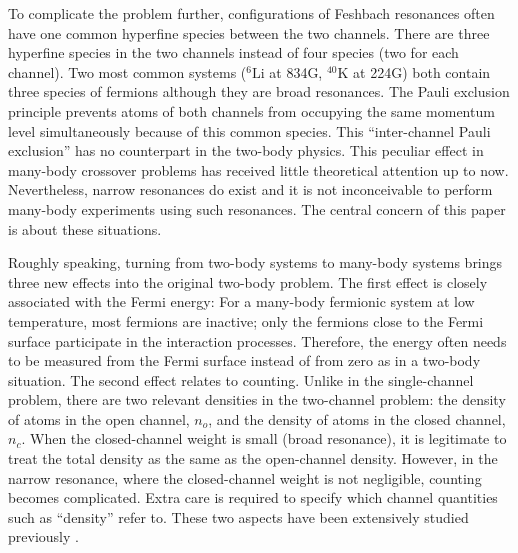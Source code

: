 \documentclass[reprint,pra]{revtex4-1}
\begin{document}

To complicate the problem  further,   configurations of Feshbach resonances often have one common hyperfine species between the two channels. There are three hyperfine species in the  two channels instead of four species (two for each channel).  Two most common systems (${}^{6}\text{Li}$ at 834G, $^{40}\text{K}$ at 224G) both contain three species of fermions although they are broad resonances.  The Pauli exclusion principle prevents  atoms of both channels from occupying the same momentum level simultaneously because of this common species.  This ``inter-channel Pauli exclusion'' has no counterpart in the two-body physics. This peculiar effect  in many-body crossover problems has  received little theoretical attention up to now.    Nevertheless,   narrow resonances do exist \cite{ChinRMP} and it is not  inconceivable to perform many-body experiments using such resonances.  The central concern of this paper is about these situations. 

Roughly speaking, turning from two-body systems to many-body systems brings three new effects into the original two-body problem.  The first effect is closely associated with the Fermi energy:  For a many-body fermionic system at low temperature, most fermions are inactive; only the fermions close to the Fermi surface participate in the interaction processes. Therefore, the energy often needs to be measured from the Fermi surface instead of from zero as in a two-body situation. 
The second effect relates to counting. Unlike in the single-channel problem, there are two relevant densities in the two-channel problem: the density of atoms in the open channel, $n_{o}$, and the density of atoms in the closed channel, $n_{c}$. When the closed-channel weight is small (broad resonance), it is legitimate to treat the total density as the same as the open-channel density.  However, in the narrow resonance, where the closed-channel weight is not negligible, counting becomes complicated.  Extra care is required to specify which channel quantities such as ``density'' refer to.  These two aspects have been   extensively studied previously \cite{GurarieNarrow}.
\end{document}
